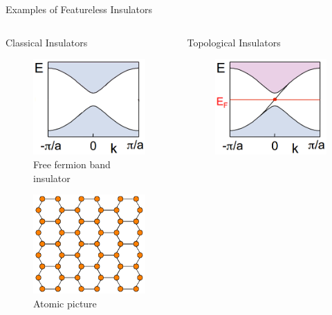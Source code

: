 \begin{frame}{Examples of Featureless Insulators}
\vskip-1.5cm
			
\begin{columns}[T]
\begin{column}[T]{.5\textwidth}
		\begin{block}{Classical Insulators}
			\vskip-0.3cm
	  	\begin{figure}
				\includegraphics[width=0.5\linewidth]{diagrams/band_insulator_2.png}
				\caption{Free fermion band insulator}
			\end{figure}
			\begin{figure}
			\vskip-0.6cm
				\includegraphics[width=0.5\linewidth]{diagrams/filled_honeycomb.pdf}
				\caption{Atomic picture}
			\end{figure}
		\end{block}
\end{column}
\begin{column}[T]{.5\textwidth}
	\begin{block}{Topological Insulators}
		\vskip-0.3cm
		\begin{figure}
			\includegraphics[width=0.5\linewidth]{diagrams/chiral_edge.png}

\end{figure}
\end{block}
\end{column}
\end{columns}
\end{frame}
